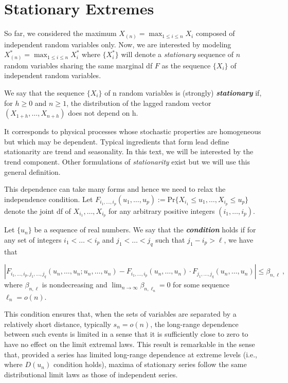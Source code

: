 \section{Stationary Extremes}\label{sec:statio}

So far, we considered the maximum $X_{(n)}=\max_{1\leq i\leq n}X_i$ composed of independent random variables only. 
 Now, we are interested by modeling 
$X^*_{(n)}=\max_{1\leq i\leq n}X^*_i$ where $\{X^*_i\}$ will denote a \emph{stationary} 
sequence of $n$ random variables sharing the same marginal df $F$ as the sequence $\{X_i\}$ of independent random variables.

\begin{definition} We say that the sequence $\{X_i\}$ of n random variables is (strongly) \emph{\textbf{stationary}} if, for $h\geq 0$ and $n\geq 1$, the distribution of the lagged random vector $(X_{1+h},\dots,X_{n+h})$ does not depend on h.
\end{definition}
It corresponds to physical processes whose stochastic properties are homogeneous but which may be dependent. Typical ingredients that form lead define stationarity are trend and seasonality. In this text, we will be interested by the trend component.  Other formulations of \emph{stationarity} exist but we will use this general definition.  

This dependence can take many forms and hence we need to relax the independence condition.
Let $F_{i_1,\dots,i_p}(u_1,\dots,u_p):=\text{Pr}\{X_{i_1}\leq 
u_1,\dots,X_{i_p}\leq u_p\}$ denote the joint df of 
$X_{i_1},\dots,X_{i_p}$ for any arbitrary positive integers $(i_1,\dots,i_p)$.

\begin{definition} 
	Let $\{u_n\}$ be a sequence of real numbers. We say that the \emph{  \textbf{condition}} holds if for any set of integers $i_1<\dots<i_p$ and $j_1<\dots<j_q$ such that $j_1-i_p>\ell$, we have that 
	
	\begin{equation}
	|F_{i_1,\dots,i_p,j_1,\dots,j_q}(u_n,\dots,u_n;u_n,\dots,u_n)-F_{i_1,\dots,i_p}(u_n,\dots,u_n)\cdot F_{j_1,\dots,j_q}(u_n,\dots, u_n)|\leq \beta_{n,\ell}\ ,
	\end{equation}
	where $\beta_{n,\ell}$ is nondecreasing and  $\displaystyle{\lim_{n \to \infty}}\beta_{n,\ell_n}=0$ for some sequence $\ell_n=o(n)$.
\end{definition}
This condition ensures that, when the sets of variables are separated by a relatively short distance, typically $s_n=o(n)$, the long-range dependence between such events is limited in a sense that it is sufficiently close to zero to have no effect on the limit extremal laws.
This result is remarkable in the sense that, provided a series has limited long-range dependence at extreme levels (i.e., where $D(u_n)$ condition holds), maxima of stationary series follow the same distributional limit laws as those of independent series.%


